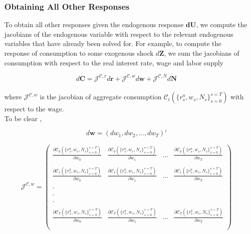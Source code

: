 \documentclass[titlepage]{\econtex}\providecommand{\texname}{BufferStockTheory}
\begin{document}
 
 
 
\hypertarget{Obtaining All Other Responses}{}
\subsubsection{Obtaining All Other Responses} 

To obtain all other responses given the endogenous response $\mathbf{dU}$, we compute the jacobians of the endogenous variable with respect to the relevant endogenous variables that have already been solved for.  For example, to compute the response of consumption to some exogenous shock $d\mathbf{Z}$, we sum  the jacobians of consumption with respect to the real interest rate, wage and labor supply 

$$ d\mathbf{C} = \mathcal{J}^{\mathcal{C} , r} d\mathbf{r} +\mathcal{J}^{\mathcal{C} , w} d\mathbf{w} +\mathcal{J}^{\mathcal{C} , N} d\mathbf{N} $$\\
 
 where $\mathcal{J}^{\mathcal{C} , w} $ is the jacobian of aggregate consumption  $\mathcal{C}_{t}(\{r_{s}^{a} ,w_{s}, N_{s}\}_{s=0}^{s=T}) $  with respect to the wage. \\
 
 To be clear , 
 
$$d\mathbf{w} =  ( dw_{1}, dw_{2}, . . . , dw_{T})' $$
 
 
 
 $$\mathcal{J}^{\mathcal{C} , w} =   \begin{pmatrix} 
\frac{ \partial \mathcal{C}_{0}(\{r_{s}^{a} ,w_{s}, N_{s}\}_{s=0}^{s=T})}{\partial w_{0}}  & \frac{ \partial \mathcal{C}_{0}(\{r_{s}^{a} ,w_{s}, N_{s}\}_{s=0}^{s=T})}{\partial w_{1}}&    ... & \frac{ \partial \mathcal{C}_{0}(\{r_{s}^{a} ,w_{s}, N_{s}\}_{s=0}^{s=T})}{\partial w_{T}} \\ \\ 
\frac{ \partial \mathcal{C}_{1}(\{r_{s}^{a} ,w_{s}, N_{s}\}_{s=0}^{s=T})}{\partial w_{0}}  &\frac{ \partial \mathcal{C}_{1}(\{r_{s}^{a} ,w_{s}, N_{s}\}_{s=0}^{s=T})}{\partial w_{1}}& ... & \frac{ \partial \mathcal{C}_{1}(\{r_{s}^{a} ,w_{s}, N_{s}\}_{s=0}^{s=T})}{\partial w_{T}} \\ \\
.  \\ \\
.  \\ \\
. \\ \\
\frac{ \partial \mathcal{C}_{T}(\{r_{s}^{a} ,w_{s}, N_{s}\}_{s=0}^{s=T})}{\partial w_{0}}  &\frac{ \partial \mathcal{C}_{T}(\{r_{s}^{a} ,w_{s}, N_{s}\}_{s=0}^{s=T})}{\partial w_{1}}& ... & \frac{ \partial \mathcal{C}_{T}(\{r_{s}^{a} ,w_{s}, N_{s}\}_{s=0}^{s=T})}{\partial w_{T}}  \\ \\
 \end{pmatrix} $$ \\
 
\end{document}

